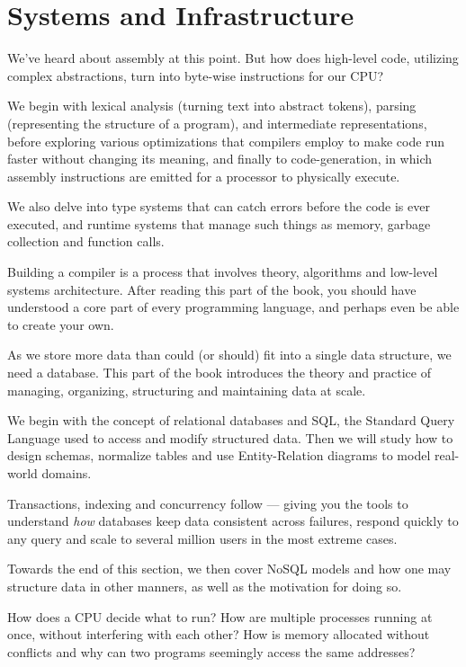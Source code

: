 \section{Systems and Infrastructure}
\begin{itemize}
  We've heard about assembly at this point.
  But how does high-level code, utilizing complex abstractions, turn into
  byte-wise instructions for our CPU\@?

  We begin with lexical analysis (turning text into abstract tokens),
  parsing (representing the structure of a program), and intermediate
  representations, before exploring various optimizations that compilers
  employ to make code run faster without changing its meaning, and finally
  to code-generation, in which assembly instructions are emitted for a processor
  to physically execute.

  We also delve into type systems that can catch errors before the code is ever
  executed, and runtime systems that manage such things as memory, garbage
  collection and function calls.

  Building a compiler is a process that involves theory, algorithms and
  low-level systems architecture. After reading this part of the book, you
  should have understood a core part of every programming language, and perhaps
  even be able to create your own.

  As we store more data than could (or should) fit into a single data structure,
  we need a database. This part of the book introduces the theory and practice
  of managing, organizing, structuring and maintaining data at scale.

  We begin with the concept of relational databases and SQL, the Standard Query
  Language used to access and modify structured data. Then we will study how to
  design schemas, normalize tables and use Entity-Relation diagrams to model
  real-world domains.

  Transactions, indexing and concurrency follow --- giving you the tools to
  understand \emph{how} databases keep data consistent across failures, respond
  quickly to any query and scale to several million users in the most extreme
  cases.

  Towards the end of this section, we then cover NoSQL models and how one may
  structure data in other manners, as well as the motivation for doing so.

  How does a CPU decide what to run? How are multiple processes running at once,
  without interfering with each other? How is memory allocated without conflicts
  and why can two programs seemingly access the same addresses?


\end{itemize}
